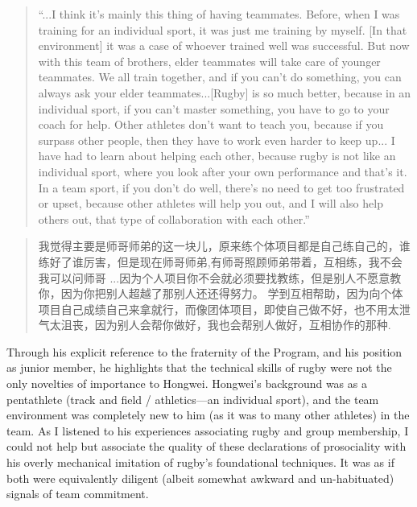 \begin{CJK}{UTF8}{gbsn}
\begin{quotation}
  ``...I think it's mainly this thing of having teammates. Before, when I was training for an individual sport, it was just me training by myself. [In that environment] it was a case of whoever trained well was successful.  But now with this team of brothers, elder teammates will take care of younger teammates. We all train together, and if you can’t do something, you can always ask your elder teammates...[Rugby] is so much better, because in an individual sport, if you can't master something, you have to go to your coach for help. Other athletes don't want to teach you, because if you surpass other people, then they have to work even harder to keep up... I have had to learn about helping each other, because rugby is not like an individual sport, where you look after your own performance and that's it.  In a team sport, if you don't do well, there's no need to get too frustrated or upset, because other athletes will help you out, and I will also help others out, that type of collaboration with each other.''
\end{quotation}

\begin{CJK}{UTF8}{gbsn}
  \begin{quotation}
    我觉得主要是师哥师弟的这一块儿，原来练个体项目都是自己练自己的，谁练好了谁厉害，但是现在师哥师弟,有师哥照顾师弟带着，互相练，我不会我可以问师哥
    ...因为个人项目你不会就必须要找教练，但是别人不愿意教你，因为你把别人超越了那别人还还得努力。 学到互相帮助，因为向个体项目自己成绩自己来拿就行，而像团体项目，即使自己做不好，也不用太泄气太沮丧，因为别人会帮你做好，我也会帮别人做好，互相协作的那种.
  \end{quotation}
\end{CJK}

Through his explicit reference to the fraternity of the Program, and his position as junior member, he highlights that the technical skills of rugby were not the only novelties of importance to Hongwei. Hongwei's background was as a pentathlete (track and field / athletics---an individual sport), and the team environment was completely new to him (as it was to many other athletes) in the team.  As I listened to his experiences associating rugby and group membership, I could not help but associate the quality of these declarations of prosociality with his overly mechanical imitation of rugby's foundational techniques.  It was as if both were equivalently diligent (albeit somewhat awkward and un-habituated) signals of team commitment.


\end{CJK}
